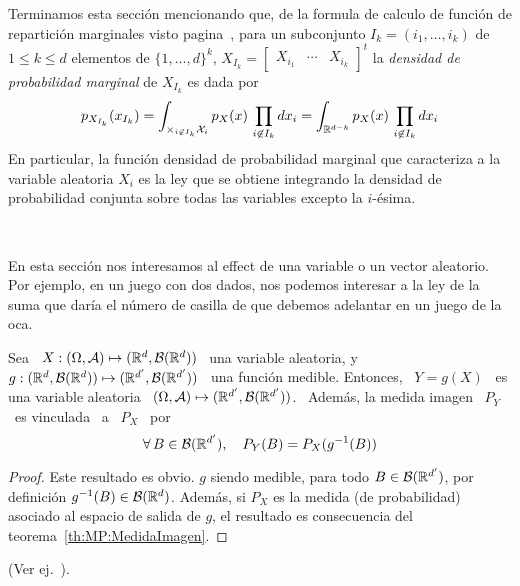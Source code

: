 Terminamos esta secci\'on mencionando que, de la formula de calculo de funci\'on
de  repartici\'on marginales visto  pagina~\pageref{pagina:MP:MarginalesF}, para
un subconjunto $I_k = (i_1,\ldots,i_k)$ de $1  \le k \le d$ elementos de $\{ 1 ,
\ldots   ,  d   \}^k$,   $X_{I_k}   =  \begin{bmatrix}   X_{i_1}   &  \cdots   &
  X_{i_k}\end{bmatrix}^t$  la   {\it  densidad  de   probabilidad  marginal}  de
$X_{I_k}$ es dada por
%
\[
p_{X_{I_k}}(x_{I_k})  = \int_{\times_{i  \not\in  I_k} \mathcal{X}_i}  p_X(x) \,  \prod_{i
    \not\in I_k}  dx_i =  \int_{\mathbb{R}^{d-k}} p_X(x) \,  \prod_{i \not\in
      I_k} dx_i
\]
%
En particular, la funci\'on densidad  de probabilidad marginal que caracteriza a
la variable aleatoria  $X_i$ es la ley que se obtiene  integrando la densidad de
probabilidad conjunta sobre todas las variables excepto la $i$-\'esima.

\




\label{sec:MP:Transformacion}

En  esta  secci\'on nos  interesamos  al  effect de  una  variable  o un  vector
aleatorio. Por  ejemplo, en un juego con  dos dados, nos podemos  interesar a la
ley de la suma que dar\'ia el n\'umero de casilla de que debemos adelantar en un
juego de la oca.
%
\begin{teorema}
  Sea  \  $X:  (\Omega,\mathcal{A})  \mapsto  (\mathbb{R}^d ,  \mathcal{B}(\mathbb{R}^d))$  \  una  variable
  aleatoria,   y  \   $g:  (\mathbb{R}^d   ,  \mathcal{B}(\mathbb{R}^d))   \mapsto   (\mathbb{R}^{d'}  ,
  \mathcal{B}(\mathbb{R}^{d'}))$ \  una funci\'on  medible. Entonces,  \ $Y =  g(X)$ \  es una
  variable aleatoria  \ $(\Omega,\mathcal{A})  \mapsto (\mathbb{R}^{d'} ,  \mathcal{B}(\mathbb{R}^{d'}))$. \
  Adem\'as, la medida imagen \ $P_Y$ \ es vinculada \ a \ $P_X$ \ por
  \[
  \forall \, B \in \mathcal{B}(\mathbb{R}^{d'}), \quad P_Y(B) = P_X(g^{-1}(B))
  \]
\end{teorema}
%
\begin{proof}
  Este resultado es obvio. $g$ siendo medible, para todo $B \in \mathcal{B}(\mathbb{R}^{d'})$,
  por definici\'on $g^{-1}(B) \in \mathcal{B}(\mathbb{R}^d)$.  Adem\'as, si $P_X$ es la medida
  (de  probabilidad) asociado  al  espacio de  salida  de $g$,  el resultado  es
  consecuencia del teorema~\ref{th:MP:MedidaImagen}.
\end{proof}
%
\noindent (Ver ej.~\cite{JacPro03, AthLah06, Bog07:v2, Coh13}).


